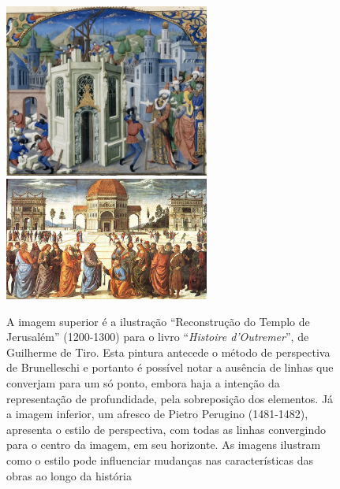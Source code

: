 \begin{figure}[h!]
  \begin{center}
\caption{A imagem superior é a ilustração ``Reconstrução do
        Templo de Jerusalém'' (1200-1300) para o livro
        ``\textit{Histoire d'Outremer}'', de Guilherme de Tiro. Esta
        pintura antecede o método de perspectiva de Brunelleschi e
        portanto é possível notar a ausência de linhas que converjam
        para um só ponto, embora haja a intenção da representação de
        profundidade, pela sobreposição dos elementos. Já a imagem
        inferior, um afresco de Pietro Perugino (1481-1482), apresenta
        o estilo de perspectiva, com todas as linhas convergindo para
        o centro da imagem, em seu horizonte. As imagens ilustram como
        o estilo pode influenciar mudanças nas características das
        obras ao longo da história}
    \label{fig:perspectiva}
    \includegraphics[width=0.6\textwidth]{figs/perspectiva1.png} \\
    \vspace{1cm}
    \includegraphics[width=0.6\textwidth]{figs/perspectiva2.png}
      
\end{center}
\end{figure}

